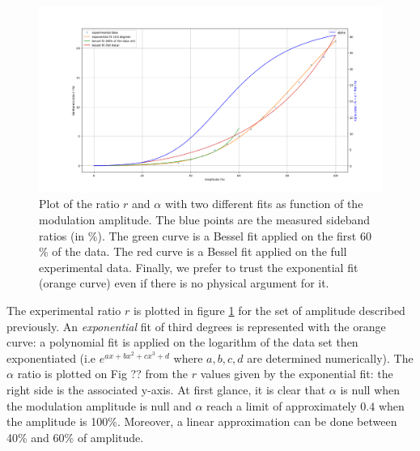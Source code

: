 \documentclass[11pt]{report}
\begin{document}
\begin{figure}[h!]
\includegraphics[width=1.25\textwidth]{sb-r-fit}
\caption{Plot of the ratio $r$ and $\alpha$ with two different fits as function of the modulation amplitude. The blue points are the measured sideband ratios (in \%). The green curve is a Bessel fit applied on the first 60 \% of the data. The red curve is a Bessel fit applied on the full experimental data. Finally, we prefer to trust the exponential fit (orange curve) even if there is no physical argument for it.}
\label{fig:sb-r-fit}
\end{figure}

The experimental ratio $r$ is plotted in figure \ref{fig:sb-r-fit} for the set of amplitude described previously. An \textit{exponential} fit of third degrees is represented with the orange curve: a polynomial fit is applied on the logarithm of the data set then exponentiated (i.e $e^{ax+bx^2+cx^3+d}$ where $a,b,c,d$ are determined numerically). The $\alpha$ ratio is plotted on Fig ?? from the $r$ values given by the exponential fit: the right side is the associated y-axis. At first glance, it is clear that $\alpha$ is null when the modulation amplitude is null and $\alpha$ reach a limit of approximately $0.4$ when the amplitude is 100\%. Moreover, a linear approximation can be done between 40\% and 60\% of amplitude.
\end{document}

